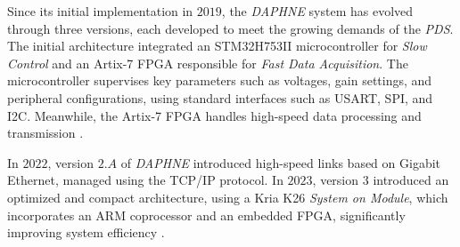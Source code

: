 

Since its initial implementation in $2019$, the \textit{DAPHNE} system has evolved through three versions, each developed to meet the growing demands of the \textit{PDS}. The initial architecture integrated an STM32H753II microcontroller for \textit{Slow Control} and an Artix-7 FPGA responsible for \textit{Fast Data Acquisition}. The microcontroller supervises key parameters such as voltages, gain settings, and peripheral configurations, using standard interfaces such as USART, SPI, and I2C. Meanwhile, the Artix-7 FPGA handles high-speed data processing and transmission \cite{STM32H753II}. %



In $2022$, version $2.A$ of \textit{DAPHNE} introduced high-speed links based on Gigabit Ethernet, managed using the TCP/IP protocol. In $2023$, version $3$ introduced an optimized and compact architecture, using a Kria K26 \textit{System on Module}, which incorporates an ARM coprocessor and an embedded FPGA, significantly improving system efficiency \cite{DUNE_Far_Detector}. %





